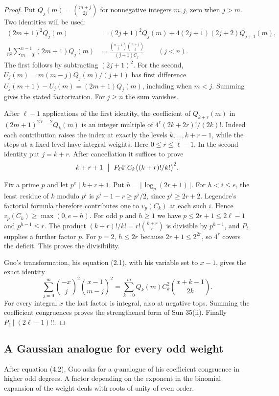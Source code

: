 \documentclass[11pt,a4paper]{article}
\theoremstyle{definition}\newtheorem{problem}[theorem]{Auxiliary problem}
\theoremstyle{remark}\newtheorem*{remark}{Remark}
\begin{document}
\begin{proof}
Put $Q_j(m)=\binom{m+j}{2j}$ for nonnegative integers $m,j$,
zero when $j>m$. Two identities will be used:
\begin{align*}
 (2m+1)^2Q_j(m)&=(2j+1)^2Q_j(m)+4(2j+1)(2j+2)Q_{j+1}(m),\\
 \frac{1}{n^2}\sum_{m=0}^{n-1}(2m+1)Q_j(m)
 &=\frac{\binom{n-1}{j}\binom{n+j}{j}}{(j+1)C_j}\qquad(j<n).
\end{align*}
The first follows by subtracting $(2j+1)^2$. For the second,
$U_j(m)=m(m-j)Q_j(m)/(j+1)$ has first difference
$U_j(m+1)-U_j(m)=(2m+1)Q_j(m)$, including when $m<j$.
Summing gives the stated factorization. For $j\ge n$ the sum vanishes.

After $\ell-1$ applications of the first identity,
the coefficient of $Q_{k+r}(m)$ in $(2m+1)^{2\ell-2}Q_k(m)$
is an integer multiple of $4^r(2k+2r)!/(2k)!$.
Indeed each contribution raises the index at exactly the levels $k,\ldots,k+r-1$,
while the steps at a fixed level have integral weights. Here $0\le r\le\ell-1$.
In the second identity put $j=k+r$. After cancellation it suffices to prove
\[
 k+r+1\ \bigm|\ P_\ell 4^r C_k \big((k+r)!/k!\big)^2 .
\]

Fix a prime $p$ and let $p^e\mid k+r+1$. Put
$h=\lfloor\log_p(2r+1)\rfloor$. For $h<i\le e$, the least residue
of $k$ modulo $p^i$ is $p^i-1-r\ge p^i/2$, since $p^i\ge2r+2$.
Legendre's factorial formula therefore contributes one to
$v_p(C_k)$ at each such $i$. Hence $v_p(C_k)\ge\max(0,e-h)$.
For odd $p$ and $h\ge1$ we have $p\le2r+1\le2\ell-1$ and
$p^{h-1}\le r$. The product $(k+r)!/k!=r!\binom{k+r}{r}$ is divisible
by $p^{h-1}$, and $P_\ell$ supplies a further factor $p$.
For $p=2$, $h\le2r$ because $2r+1\le 2^{2r}$, so $4^r$ covers
the deficit. This proves the divisibility.

Guo's transformation, his equation (2.1), with his variable set to $x-1$,
gives the exact identity
\[
 \sum_{j=0}^{m}\binom{-x}{j}^2\binom{x-1}{m-j}^2
 =\sum_{k=0}^{m}Q_k(m) C_k^2\binom{x+k-1}{2k}.
\]
For every integral $x$ the last factor is integral, also at negative tops.
Summing the coefficient congruences proves the strengthened form of Sun
35(ii). Finally $P_\ell\mid (2\ell-1)!!$.
\end{proof}


\subsection{A Gaussian analogue for every odd weight}
After equation (4.2), Guo asks for a $q$-analogue of his coefficient congruence
in higher odd degrees. A factor depending on the exponent in the binomial
expansion of the weight deals with roots of unity of even order.
\end{document}
